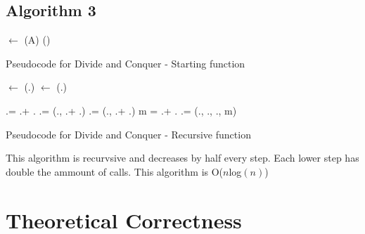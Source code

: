 \documentclass[a4paper,10pt]{article}
\begin{document}
		\subsection{Algorithm 3}
			\begin{algorithm}[H]
				\SetAlgoLined
				\LinesNumbered
				\DontPrintSemicolon
				\begin{algorithm}[H]
					\Sums $\gets$ \MSr(A)\;
					\Return \Max(\Sums)\;
					\caption{Pseudocode for Divide and Conquer - Starting function}
				\end{algorithm}

				\begin{algorithm}[H]


					\BlankLine

					\LS $\gets$ \MSr(\A.\LB)\;
					\RS $\gets$ \MSr(\A.\RB)\;

					\BlankLine

					\Sums.\All = \LS.\All + \RS.\All\;
					\Sums.\Left = \Max(\LS.\Left, \LS.\All + \RS.\Left)\;   %
					\Sums.\Right = \Max(\RS.\Right, \LS.\Right + \RS.\All)\;
					m = \LS.\Right + \RS.\Left\;
					\Sums.\Overall = \Max(\Sums.\All, \Sums.\Left, \Sums.\Right, m)\;

					\BlankLine

					\Return \Sums
					
					\caption{Pseudocode for Divide and Conquer - Recursive function}
				\end{algorithm}
			\end{algorithm}
			This algorithm is recurvsive and decreases by half every step.  Each lower step has double the ammount of calls.  This algorithm is O($n$log$(n)$)
	\section{Theoretical Correctness}
\end{document}
